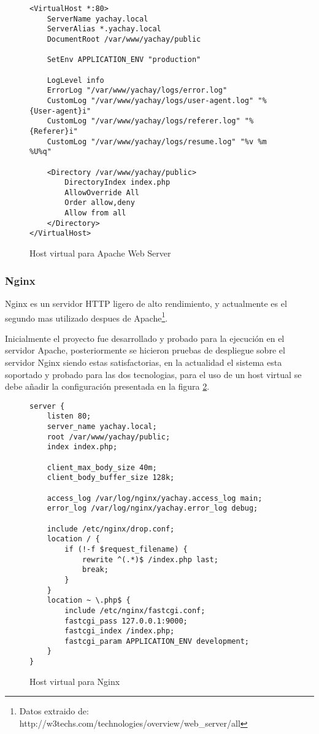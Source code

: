 \begin{figure}
\begin{verbatim}
<VirtualHost *:80>
    ServerName yachay.local
    ServerAlias *.yachay.local
    DocumentRoot /var/www/yachay/public

    SetEnv APPLICATION_ENV "production"

    LogLevel info
    ErrorLog "/var/www/yachay/logs/error.log"
    CustomLog "/var/www/yachay/logs/user-agent.log" "%{User-agent}i"
    CustomLog "/var/www/yachay/logs/referer.log" "%{Referer}i"
    CustomLog "/var/www/yachay/logs/resume.log" "%v %m %U%q"

    <Directory /var/www/yachay/public>
        DirectoryIndex index.php
        AllowOverride All
        Order allow,deny
        Allow from all
    </Directory>
</VirtualHost>
\end{verbatim}
\caption{Host virtual para Apache Web Server}
\label{config_apache}
\end{figure}

\subsubsection{Nginx}
Nginx es un servidor HTTP ligero de alto rendimiento, y actualmente es el
segundo mas utilizado despues de Apache\footnote{Datos extraido de:
http://w3techs.com/technologies/overview/web\_server/all}.

Inicialmente el proyecto fue desarrollado y probado para la ejecución en el
servidor Apache, posteriormente se hicieron pruebas de despliegue sobre el
servidor Nginx siendo estas satisfactorias, en la actualidad el sistema esta
soportado y probado para las dos tecnologias, para el uso de un host virtual se
debe añadir la configuración presentada en la figura \ref{config_nginx}.

\begin{figure}
\begin{verbatim}
server {
    listen 80;
    server_name yachay.local;
    root /var/www/yachay/public;
    index index.php;

    client_max_body_size 40m;
    client_body_buffer_size 128k;

    access_log /var/log/nginx/yachay.access_log main;
    error_log /var/log/nginx/yachay.error_log debug;

    include /etc/nginx/drop.conf;
    location / {
        if (!-f $request_filename) {
            rewrite ^(.*)$ /index.php last;
            break;
        }
    }
    location ~ \.php$ {
        include /etc/nginx/fastcgi.conf;
        fastcgi_pass 127.0.0.1:9000;
        fastcgi_index /index.php;
        fastcgi_param APPLICATION_ENV development;
    }
}
\end{verbatim}
\caption{Host virtual para Nginx}
\label{config_nginx}
\end{figure}

